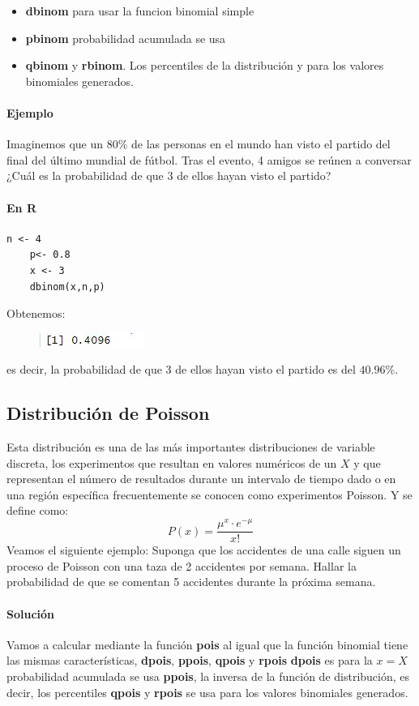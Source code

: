 \documentclass[12pt,hidelinks]{article}
\begin{document}
\begin{itemize}
	\item \textbf{dbinom} para usar la funcion binomial simple
	\item \textbf{pbinom} probabilidad acumulada se usa
	\item \textbf{qbinom} y \textbf{rbinom}. Los percentiles de la distribución y para los valores binomiales generados.
\end{itemize}
\paragraph{Ejemplo} Imaginemos que un $80\%$ de las personas en el mundo han visto el partido  del final del último mundial de fútbol. Tras el evento, 4 amigos se reúnen a conversar ¿Cuál es la probabilidad de que 3 de ellos hayan visto el partido?
\paragraph{En R}
\begin{lstlisting}[frame=single]
	n <- 4
	p<- 0.8
	x <- 3
	dbinom(x,n,p)
\end{lstlisting}
Obtenemos:
\begin{figure}[h!]
	\centering
	\includegraphics[width=0.4\linewidth]{images/3/binomial.JPG}
\end{figure}
es decir, la probabilidad de que 3 de ellos hayan visto el partido es del $40.96\%$.
\subsection{Distribución de Poisson}
Esta distribución es una de las más importantes distribuciones de variable discreta, los experimentos que resultan en valores numéricos de un $X$ y que representan el número de resultados durante un intervalo de tiempo dado o en una región específica frecuentemente se conocen como experimentos Poisson. Y se define como:
\[
	P(x)=\frac{\mu^x \cdot e^{-\mu}}{x!}
\]
Veamos el siguiente ejemplo: Suponga que los accidentes de una calle siguen un proceso de Poisson con una taza de 2 accidentes por semana. Hallar la probabilidad de que se comentan 5 accidentes durante la próxima semana.
\paragraph{Solución} Vamos a calcular mediante la función \textbf{pois} al igual que la función binomial tiene las mismas características, \textbf{dpois}, \textbf{ppois}, \textbf{qpois} y \textbf{rpois} \textbf{dpois} es para la $x=X$ probabilidad acumulada se usa \textbf{ppois}, la inversa de la función de distribución, es decir, los percentiles \textbf{qpois} y \textbf{rpois} se usa para los valores binomiales generados.
\end{document}
